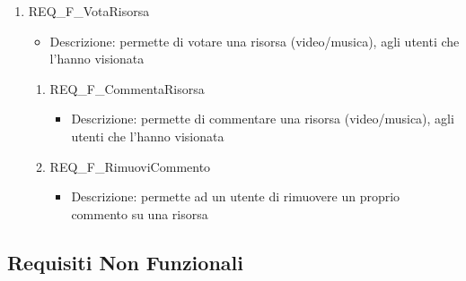 \begin{enumerate}
	\item REQ\_F\_VotaRisorsa
		\begin{itemize}	
			\item Descrizione: permette di votare una risorsa (video/musica), agli utenti che l'hanno visionata
		\end{itemize}
		\begin{enumerate}[label*=\arabic*.]
		\item REQ\_F\_CommentaRisorsa
			\begin{itemize}	
				\item Descrizione: permette di commentare una risorsa (video/musica), agli utenti che l'hanno visionata
			\end{itemize}
		\item REQ\_F\_RimuoviCommento
			\begin{itemize}	
				\item Descrizione: permette ad un utente di rimuovere un proprio commento su una risorsa
			\end{itemize}
		\end{enumerate}
		


\end{enumerate}

\subsection{Requisiti Non Funzionali}

